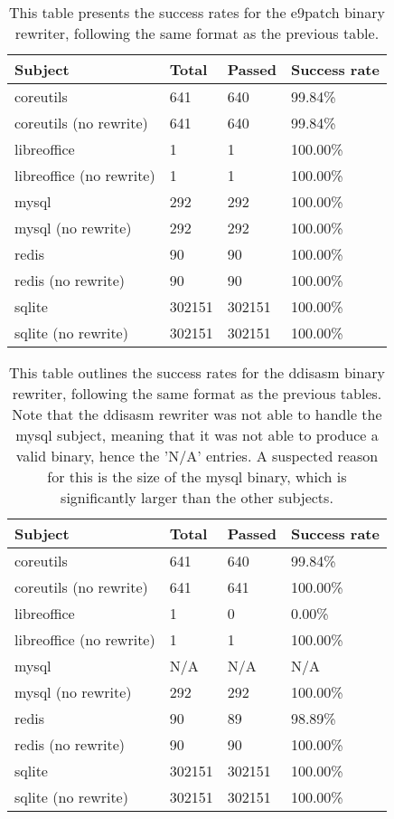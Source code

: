 \documentclass[a4paper,11pt,oneside]{report}
\begin{document}
    \begin{table}[h]
    \centering
    \caption{This table presents the success rates for the e9patch binary rewriter, following the same format as the previous table.}
    \begin{tabular}{|l|l|l|l|}
    \hline
    Subject & Total & Passed & Success rate \\ \hline
    coreutils & 641 & 640 & 99.84\% \\ \hline
    coreutils (no rewrite) & 641 & 640 & 99.84\% \\ \hline
    libreoffice & 1 & 1 & 100.00\% \\ \hline
    libreoffice (no rewrite) & 1 & 1 & 100.00\% \\ \hline
    mysql & 292 & 292 & 100.00\% \\ \hline
    mysql (no rewrite) & 292 & 292 & 100.00\% \\ \hline
    redis & 90 & 90 & 100.00\% \\ \hline
    redis (no rewrite) & 90 & 90 & 100.00\% \\ \hline
    sqlite & 302151 & 302151 & 100.00\% \\ \hline
    sqlite (no rewrite) & 302151 & 302151 & 100.00\% \\ \hline
    \end{tabular}
    \end{table}
    
    \begin{table}[h]
    \centering
    \caption{This table outlines the success rates for the ddisasm binary rewriter, 
    following the same format as the previous tables. Note that the ddisasm rewriter was not able to handle the mysql subject,
    meaning that it was not able to produce a valid binary, hence the 'N/A' entries.
    A suspected reason for this is the size of the mysql binary, which is significantly larger than the other subjects.}
    \begin{tabular}{|l|l|l|l|}
    \hline
    Subject & Total & Passed & Success rate \\ \hline
    coreutils & 641 & 640 & 99.84\% \\ \hline
    coreutils (no rewrite) & 641 & 641 & 100.00\% \\ \hline
    libreoffice & 1 & 0 & 0.00\% \\ \hline
    libreoffice (no rewrite) & 1 & 1 & 100.00\% \\ \hline
    mysql & N/A & N/A & N/A \\ \hline
    mysql (no rewrite) & 292 & 292 & 100.00\% \\ \hline
    redis & 90 & 89 & 98.89\% \\ \hline
    redis (no rewrite) & 90 & 90 & 100.00\% \\ \hline
    sqlite & 302151 & 302151 & 100.00\% \\ \hline
    sqlite (no rewrite) & 302151 & 302151 & 100.00\% \\ \hline
    \end{tabular}
    \end{table}
    
\end{document}

